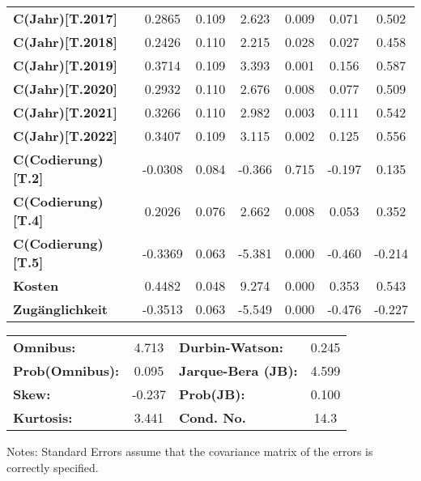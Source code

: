 \begin{center}
\begin{tabular}{lcccccc}
\textbf{C(Jahr)[T.2017]}   &       0.2865  &        0.109     &     2.623  &         0.009        &        0.071    &        0.502     \\
\textbf{C(Jahr)[T.2018]}   &       0.2426  &        0.110     &     2.215  &         0.028        &        0.027    &        0.458     \\
\textbf{C(Jahr)[T.2019]}   &       0.3714  &        0.109     &     3.393  &         0.001        &        0.156    &        0.587     \\
\textbf{C(Jahr)[T.2020]}   &       0.2932  &        0.110     &     2.676  &         0.008        &        0.077    &        0.509     \\
\textbf{C(Jahr)[T.2021]}   &       0.3266  &        0.110     &     2.982  &         0.003        &        0.111    &        0.542     \\
\textbf{C(Jahr)[T.2022]}   &       0.3407  &        0.109     &     3.115  &         0.002        &        0.125    &        0.556     \\
\textbf{C(Codierung)[T.2]} &      -0.0308  &        0.084     &    -0.366  &         0.715        &       -0.197    &        0.135     \\
\textbf{C(Codierung)[T.4]} &       0.2026  &        0.076     &     2.662  &         0.008        &        0.053    &        0.352     \\
\textbf{C(Codierung)[T.5]} &      -0.3369  &        0.063     &    -5.381  &         0.000        &       -0.460    &       -0.214     \\
\textbf{Kosten}            &       0.4482  &        0.048     &     9.274  &         0.000        &        0.353    &        0.543     \\
\textbf{Zugänglichkeit}    &      -0.3513  &        0.063     &    -5.549  &         0.000        &       -0.476    &       -0.227     \\
\bottomrule
\end{tabular}
\begin{tabular}{lclc}
\textbf{Omnibus:}       &  4.713 & \textbf{  Durbin-Watson:     } &    0.245  \\
\textbf{Prob(Omnibus):} &  0.095 & \textbf{  Jarque-Bera (JB):  } &    4.599  \\
\textbf{Skew:}          & -0.237 & \textbf{  Prob(JB):          } &    0.100  \\
\textbf{Kurtosis:}      &  3.441 & \textbf{  Cond. No.          } &     14.3  \\
\bottomrule
\end{tabular}
\end{center}

Notes: \newline
 [1] Standard Errors assume that the covariance matrix of the errors is correctly specified.
